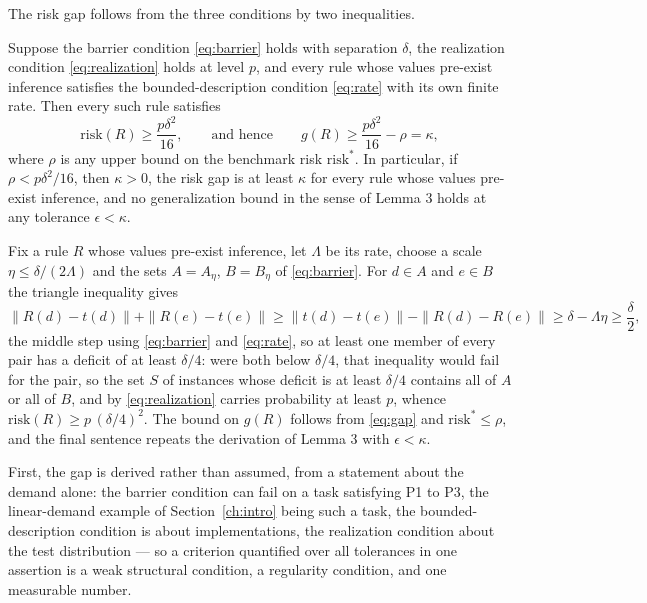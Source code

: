 The risk gap follows from the three conditions by two inequalities.

\begin{uprop}
Suppose the barrier condition \eqref{eq:barrier} holds with separation $\delta$, the realization condition \eqref{eq:realization} holds at level $p$, and every rule whose values pre-exist inference satisfies the bounded-description condition \eqref{eq:rate} with its own finite rate. Then every such rule satisfies
\begin{equation}
\mathrm{risk}(R) \ge \frac{p \delta^2}{16} , \qquad \text{and hence} \qquad g(R) \ge \frac{p \delta^2}{16} - \rho = \kappa ,
\label{eq:floor}
\end{equation}
where $\rho$ is any upper bound on the benchmark risk $\mathrm{risk}^*$. In particular, if $\rho < p \delta^2 / 16$, then $\kappa > 0$, the risk gap is at least $\kappa$ for every rule whose values pre-exist inference, and no generalization bound in the sense of Lemma 3 holds at any tolerance $\epsilon < \kappa$.
\end{uprop}

\argument Fix a rule $R$ whose values pre-exist inference, let $\Lambda$ be its rate, choose a scale $\eta \le \delta / (2 \Lambda)$ and the sets $A = A_\eta$, $B = B_\eta$ of \eqref{eq:barrier}. For $d \in A$ and $e \in B$ the triangle inequality gives
\begin{equation}
\| R(d) - t(d) \| + \| R(e) - t(e) \| \ge \| t(d) - t(e) \| - \| R(d) - R(e) \| \ge \delta - \Lambda \eta \ge \frac{\delta}{2},
\label{eq:deficit}
\end{equation}
the middle step using \eqref{eq:barrier} and \eqref{eq:rate}, so at least one member of every pair has a deficit of at least $\delta / 4$: were both below $\delta / 4$, that inequality would fail for the pair, so the set $S$ of instances whose deficit is at least $\delta / 4$ contains all of $A$ or all of $B$, and by \eqref{eq:realization} carries probability at least $p$, whence $\mathrm{risk}(R) \ge p \, (\delta / 4)^2$. The bound on $g(R)$ follows from \eqref{eq:gap} and $\mathrm{risk}^* \le \rho$, and the final sentence repeats the derivation of Lemma 3 with $\epsilon < \kappa$.\qedbox

First, the gap is derived rather than assumed, from a statement about the demand alone: the barrier condition can fail on a task satisfying P1 to P3, the linear-demand example of Section~\ref{ch:intro} being such a task, the bounded-description condition is about implementations, the realization condition about the test distribution --- so a criterion quantified over all tolerances in one assertion is a weak structural condition, a regularity condition, and one measurable number.

